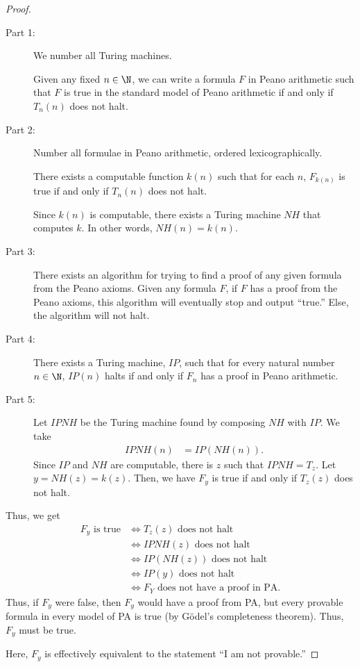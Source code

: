 \documentclass[10pt]{mypackage}
\begin{document}
\begin{proof}\hfill
  \begin{description}
    \item[Part 1:] We number all Turing machines.
      \begin{lemma}[]
        Given any fixed $n\in \N$, we can write a formula $F$ in Peano arithmetic such that $F$ is true in the standard model of Peano arithmetic if and only if $T_{n}(n)$ does not halt.
      \end{lemma}
    \item[Part 2:] Number all formulae in Peano arithmetic, ordered lexicographically.
      \begin{lemma}[]
        There exists a computable function $k(n)$ such that for each $n$, $F_{k(n)}$ is true if and only if $T_{n}(n)$ does not halt.
      \end{lemma}
      Since $k(n)$ is computable, there exists a Turing machine $NH$ that computes $k$. In other words, $NH(n) = k(n)$.
    \item[Part 3:] There exists an algorithm for trying to find a proof of any given formula from the Peano axioms. Given any formula $F$, if $F$ has a proof from the Peano axioms, this algorithm will eventually stop and output ``true.'' Else, the algorithm will not halt.
    \item[Part 4:] There exists a Turing machine, $IP$, such that for every natural number $n\in \N$, $IP(n)$ halts if and only if $F_{n}$ has a proof in Peano arithmetic.
    \item[Part 5:] Let $IPNH$ be the Turing machine found by composing $NH$ with $IP$. We take
      \begin{align*}
        IPNH \left(n\right) &= IP\left(NH\left(n\right)\right).
      \end{align*}
      Since $IP$ and $NH $ are computable, there is $z$ such that $IPNH = T_{z}$. Let $y = NH(z) = k(z)$. Then, we have $F_y$ is true if and only if $T_{z}(z)$ does not halt.
  \end{description}
  Thus, we get
  \begin{align*}
    F_y\text{ is true} &\Leftrightarrow T_z\left(z\right)\text{ does not halt}\\
                       &\Leftrightarrow IPNH\left(z\right)\text{ does not halt}\\
                       &\Leftrightarrow IP\left(NH\left(z\right)\right)\text{ does not halt}\\
                       &\Leftrightarrow IP\left(y\right)\text{ does not halt}\\
                       &\Leftrightarrow F_Y\text{ does not have a proof in PA.}
  \end{align*}
  Thus, if $F_y$ were false, then $F_y$ would have a proof from PA, but every provable formula in every model of PA is true (by Gödel's completeness theorem). Thus, $F_y$ must be true.\newline

  Here, $F_y$ is effectively equivalent to the statement ``I am not provable.''
\end{proof}
\end{document}
